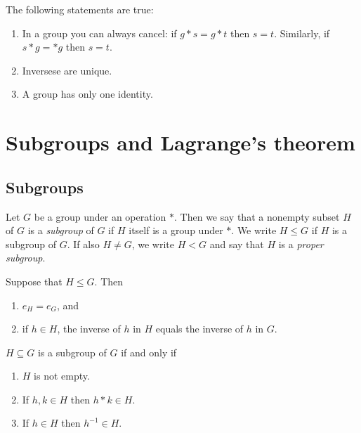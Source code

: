 \documentclass{article}
\begin{document}
\setcounter{theorem}{7}
\begin{corollary}
    The following statements are true:
    \begin{enumerate}
        \item In a group you can always cancel: if $g* s=g* t$ 
        then $s=t$. Similarly, if $s* g=* g$ then $s=t$.
        \item Inversese are unique.
        \item A group has only one identity.
    \end{enumerate}
\end{corollary}


\section{Subgroups and Lagrange's theorem}


\subsection{Subgroups}

\begin{definition}
    Let $G$ be a group under an operation $*$. Then we say that a nonempty
    subset $H$ of $G$ is a \emph{subgroup} of $G$ if $H$ itself is a group under $*$.
    We write $H\leq G$ if $H$ is a subgroup of $G$. If also $H\not=G$, we write
    $H<G$ and say that $H$ is a \emph{proper subgroup}.
\end{definition}

\begin{lemma}
    Suppose that $H\leq G$. Then
    \begin{enumerate}
        \item $e_H = e_G$, and
        \item if $h\in H$, the inverse of $h$ in $H$ equals the inverse of $h$ in $G$.
    \end{enumerate}
\end{lemma}

\begin{theorem}
    $H\subseteq G$ is a subgroup of $G$ if and only if
    \begin{enumerate}[label=S\arabic*.]
        \item $H$ is not empty.
        \item If $h,k\in H$ then $h*k\in H$.
        \item If $h\in H$ then $h^{-1}\in H$.
    \end{enumerate}
\end{theorem}
\end{document}
